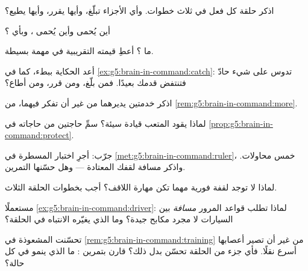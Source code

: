 \begin{exercise}[$\star$]\label{exo:g5:brain-in-command:2}
اذكر حلقة كل فعل في ثلاث خطوات. وأي الأجزاء تبلّغ، وأيها يقرر،
وأيها يطيع؟
\end{exercise}

\begin{exercise}[$\star$]\label{exo:g5:brain-in-command:3}
أين يُحمى  وأين يُحمى ، وبأي ؟
\end{exercise}

\begin{exercise}[$\star$]\label{exo:g5:brain-in-command:4}
ما ؟ أعطِ قيمته التقريبية في مهمة بسيطة.
\end{exercise}

\begin{exercise}[$\star$]\label{exo:g5:brain-in-command:5}
أعد الحكاية ببطء، كما في \cref{ex:g5:brain-in-command:catch}: تدوس
على شيء حادّ فتنتفض قدمك بعيدًا. فمن بلّغ، ومن قرر، ومن أطاع؟
\end{exercise}

\begin{exercise}[$\star$]\label{exo:g5:brain-in-command:6}
اذكر خدمتين يديرهما  من غير أن تفكر فيهما، من
\cref{rem:g5:brain-in-command:more}.
\end{exercise}

\begin{exercise}[$\star$]\label{exo:g5:brain-in-command:7}
لماذا يقود  المتعب قيادة سيئة؟ سمِّ حاجتين من حاجاته في
\cref{prop:g5:brain-in-command:protect}.
\end{exercise}

\begin{exercise}[$\star$]\label{exo:g5:brain-in-command:8}
جرّب: أجرِ اختبار المسطرة في
\cref{met:g5:brain-in-command:ruler}، خمس محاولات. واذكر مسافة
لقفك المعتادة --- وهل حسّنها التمرين.
\end{exercise}

\begin{exercise}[$\star\star$]\label{exo:g5:brain-in-command:9}
لماذا لا توجد لقفة فورية مهما تكن مهارة اللاقف؟ أجب بخطوات الحلقة
الثلاث.
\end{exercise}

\begin{exercise}[$\star\star$]\label{exo:g5:brain-in-command:10}
مستعملًا \cref{ex:g5:brain-in-command:driver}: لماذا تطلب قواعد
المرور \emph{مسافة} بين السيارات لا مجرد مكابح جيدة؟ وما الذي
يغيّره الانتباه في الحلقة؟
\end{exercise}

\begin{exercise}[$\star\star\star$]\label{exo:g5:brain-in-command:11}
تحسّنت المشعوذة في \cref{rem:g5:brain-in-command:training} من غير
أن تصير أعصابها أسرع نقلًا. فأي جزء من الحلقة تحسّن بدل ذلك؟ قارن
بتمرين : ما الذي ينمو في كل حالة؟
\end{exercise}
